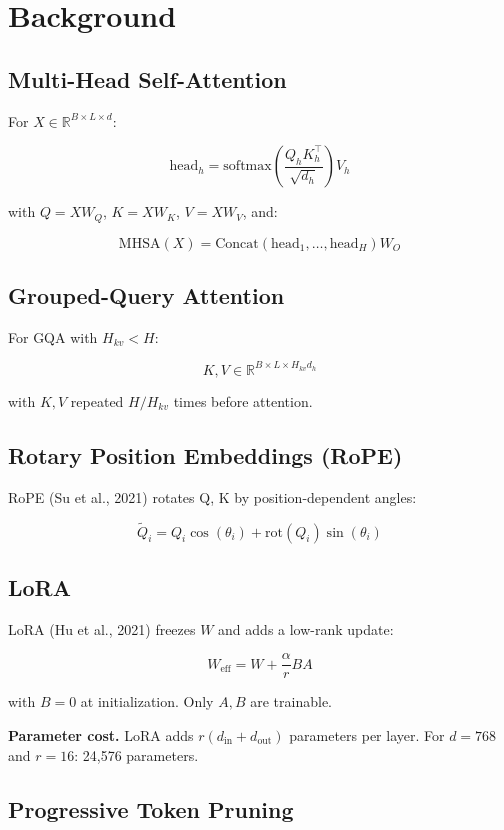 
\section{Background}

\subsection{Multi-Head Self-Attention}

For $X \in \mathbb{R}^{B \times L \times d}$:

\[
\text{head}_h = \text{softmax}\!\left(\frac{Q_h K_h^\top}{\sqrt{d_h}}\right) V_h
\tag{3.1}
\]

with $Q = X W_Q$, $K = X W_K$, $V = X W_V$, and:

\[
\text{MHSA}(X) = \text{Concat}(\text{head}_1, \dots, \text{head}_H) W_O
\tag{3.2}
\]

\subsection{Grouped-Query Attention}

For GQA with $H_{kv} < H$:

\[
K, V \in \mathbb{R}^{B \times L \times H_{kv} d_h}
\tag{3.3}
\]

with $K, V$ repeated $H / H_{kv}$ times before attention.

\subsection{Rotary Position Embeddings (RoPE)}

RoPE (Su et al., 2021) rotates Q, K by position-dependent angles:

\[
\tilde{Q}_i = Q_i \cos(\theta_i) + \text{rot}(Q_i) \sin(\theta_i)
\tag{3.4}
\]

\subsection{LoRA}

LoRA (Hu et al., 2021) freezes $W$ and adds a low-rank update:

\[
W_\text{eff} = W + \frac{\alpha}{r} B A
\tag{3.5}
\]

with $B = 0$ at initialization. Only $A, B$ are trainable.

\textbf{Parameter cost.} LoRA adds $r(d_\text{in} + d_\text{out})$ parameters 
per layer. For $d = 768$ and $r = 16$: 24,576 parameters.

\subsection{Progressive Token Pruning}


